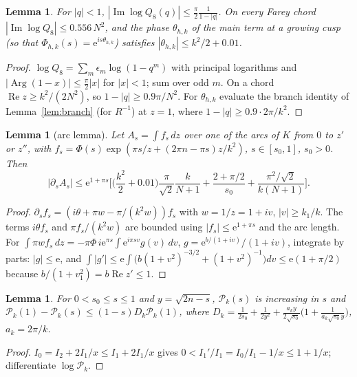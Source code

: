 \documentclass[11pt]{amsart}
\newtheorem{lemma}[theorem]{Lemma}
\theoremstyle{remark}
\theoremstyle{definition}
\newcommand{\cP}{\mathcal P}
\newcommand{\Rea}{\operatorname{Re}}
\newcommand{\Ima}{\operatorname{Im}}
\newcommand{\Arg}{\operatorname{Arg}}
\newcommand{\e}{\mathrm e}
\begin{document}
\begin{lemma}\label{lem:imlog}
For $|q|<1$, $|\Ima\log Q_8(q)|\le\frac{\pi}{2}\frac{1}{1-|q|}$. On every Farey chord $|\Ima\log Q_8|\le0.556\,N^2$, and the phase $\theta_{h,k}$ of the main term at a growing cusp (so that $\Phi_{h,k}(s)=\e^{is\theta_{h,k}}$) satisfies $|\theta_{h,k}|\le k^2/2+0.01$.
\end{lemma}
\begin{proof}
$\log Q_8=\sum_m\epsilon_m\log(1-q^m)$ with principal logarithms and $|\Arg(1-x)|\le\frac\pi2|x|$ for $|x|<1$; sum over odd $m$. On a chord $\Rea z\ge k^2/(2N^2)$, so $1-|q|\ge0.9\pi/N^2$. For $\theta_{h,k}$ evaluate the branch identity of Lemma~\ref{lem:branch} (for $R^{-1}$) at $z=1$, where $1-|q|\ge0.9\cdot2\pi/k^2$.
\end{proof}

\begin{lemma}[arc lemma]\label{lem:arc}
Let $A_s=\int f_s\,dz$ over one of the arcs of $K$ from $0$ to $z'$ or $z''$, with $f_s=\Phi(s)\exp(\pi s/z+(2\pi n-\pi s)z/k^2)$, $s\in[s_0,1]$, $s_0>0$. Then
\[
|\partial_sA_s|\le\e^{1+\pi s}\Big[\Big(\frac{k^2}2+0.01\Big)\frac{\pi}{\sqrt2}\frac{k}{N+1}+\frac{2+\pi/2}{s_0}+\frac{\pi^2/\sqrt2}{k(N+1)}\Big].
\]
\end{lemma}
\begin{proof}
$\partial_sf_s=(i\theta+\pi w-\pi/(k^2w))f_s$ with $w=1/z=1+iv$, $|v|\ge k_1/k$. The terms $i\theta f_s$ and $\pi f_s/(k^2w)$ are bounded using $|f_s|\le\e^{1+\pi s}$ and the arc length. For $\int\pi w f_s\,dz=-\pi\Phi\,i\e^{\pi s}\int\e^{i\pi sv}g(v)\,dv$, $g=\e^{b/(1+iv)}/(1+iv)$, integrate by parts: $|g|\le\e$, and $\int|g'|\le\e\int\big(b(1+v^2)^{-3/2}+(1+v^2)^{-1}\big)dv\le\e(1+\pi/2)$ because $b/(1+v_1^2)=b\Rea z'\le1$.
\end{proof}

\begin{lemma}\label{lem:dP}
For $0<s_0\le s\le1$ and $y=\sqrt{2n-s}$, $\cP_k(s)$ is increasing in $s$ and $\cP_k(1)-\cP_k(s)\le(1-s)D_k\cP_k(1)$, where $D_k=\frac1{2s_0}+\frac1{2y^2}+\frac{a_ky}{2\sqrt{s_0}}\big(1+\frac1{a_k\sqrt{s_0}y}\big)$, $a_k=2\pi/k$.
\end{lemma}
\begin{proof}
$I_0=I_2+2I_1/x\le I_1+2I_1/x$ gives $0<I_1'/I_1=I_0/I_1-1/x\le1+1/x$; differentiate $\log\cP_k$.
\end{proof}
\end{document}
